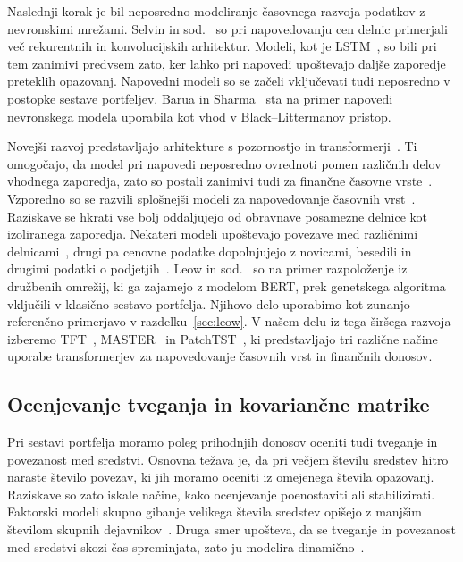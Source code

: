 \documentclass[9pt]{style/friteza}
\begin{document}
Naslednji korak je bil neposredno modeliranje časovnega razvoja podatkov z nevronskimi mrežami. Selvin in sod.~\cite{selvin2017stock} so pri napovedovanju cen delnic primerjali več rekurentnih in konvolucijskih arhitektur. Modeli, kot je LSTM~\cite{hochreiter1997lstm}, so bili pri tem zanimivi predvsem zato, ker lahko pri napovedi upoštevajo daljše zaporedje preteklih opazovanj. Napovedni modeli so se začeli vključevati tudi neposredno v postopke sestave portfeljev. Barua in Sharma~\cite{barua2022} sta na primer napovedi nevronskega modela uporabila kot vhod v Black--Littermanov pristop.

Novejši razvoj predstavljajo arhitekture s pozornostjo in transformerji~\cite{vaswani2017}. Ti omogočajo, da model pri napovedi neposredno ovrednoti pomen različnih delov vhodnega zaporedja, zato so postali zanimivi tudi za finančne časovne vrste~\cite{wang2022,zhang2022transformer}. Vzporedno so se razvili splošnejši modeli za napovedovanje časovnih vrst~\cite{wu2021autoformer,das2024timesfm}. Raziskave se hkrati vse bolj oddaljujejo od obravnave posamezne delnice kot izoliranega zaporedja. Nekateri modeli upoštevajo povezave med različnimi delnicami~\cite{ye2020multigraph,li2020graphstock}, drugi pa cenovne podatke dopolnjujejo z novicami, besedili in drugimi podatki o podjetjih~\cite{sawhney2020deep,cheng2022multimodality}. Leow in sod.~\cite{leow2021} so na primer razpoloženje iz družbenih omrežij, ki ga zajamejo z modelom BERT, prek genetskega algoritma vključili v klasično sestavo portfelja. Njihovo delo uporabimo kot zunanjo referenčno primerjavo v razdelku~\ref{sec:leow}. V našem delu iz tega širšega razvoja izberemo TFT~\cite{lim2021tft}, MASTER~\cite{li2024master} in PatchTST~\cite{nie2023patchtst}, ki predstavljajo tri različne načine uporabe transformerjev za napovedovanje časovnih vrst in finančnih donosov.

\subsection{Ocenjevanje tveganja in kovariančne matrike}

Pri sestavi portfelja moramo poleg prihodnjih donosov oceniti tudi tveganje in povezanost med sredstvi. Osnovna težava je, da pri večjem številu sredstev hitro naraste število povezav, ki jih moramo oceniti iz omejenega števila opazovanj. Raziskave so zato iskale načine, kako ocenjevanje poenostaviti ali stabilizirati. Faktorski modeli skupno gibanje velikega števila sredstev opišejo z manjšim številom skupnih dejavnikov~\cite{fan2008}. Druga smer upošteva, da se tveganje in povezanost med sredstvi skozi čas spreminjata, zato ju modelira dinamično~\cite{engle2002,chiriac2011}.
\end{document}
